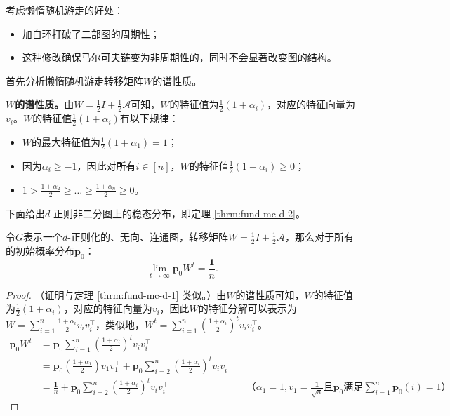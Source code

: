 \documentclass[lang=cn,newtx,10pt,scheme=chinese,chinesefont=nofont,citestyle=gb7714-2015, bibstyle=gb7714-2015]{elegantbook}
\begin{document}
\begin{refsection}
考虑懒惰随机游走的好处：
\begin{itemize}
    \item 加自环打破了二部图的周期性；
    \item 这种修改确保马尔可夫链变为非周期性的，同时不会显著改变图的结构。
\end{itemize}

首先分析懒惰随机游走转移矩阵$W$的谱性质。
            
\vspace{0.2cm}
\textbf{$W$的谱性质。}由$W=\frac{1}{2}I+\frac{1}{2}\mathcal{A}$可知，$W$的特征值为$\frac{1}{2}(1+\alpha_i)$，对应的特征向量为$v_i$。$W$的特征值$\frac{1}{2}(1+\alpha_i)$有以下规律：
\begin{itemize}
    \item $W$的最大特征值为$\frac{1}{2}(1+\alpha_1)=1$；
    \item 因为$\alpha_i\ge -1$，因此对所有$i\in[n]$，$W$的特征值$\frac{1}{2}(1+\alpha_i)\ge 0$；
    \item $1> \frac{1+\alpha_2}{2}\ge \dots\ge \frac{1+\alpha_n}{2}\ge 0$。
\end{itemize}
            
下面给出$d$-正则非二分图上的稳态分布，即定理 \ref{thrm:fund-mc-d-2}。

\begin{theorem}
    \label{thrm:fund-mc-d-2}
    令$G$表示一个$d$-正则化的、无向、连通图，转移矩阵$W=\frac{1}{2}I+\frac{1}{2}\mathcal{A}$，那么对于所有的初始概率分布$\bm{p}_0$：
    \[
        \lim_{t \to \infty} \bm{p}_0W^t  = \frac{\bm{1}}{n}.
    \]
\end{theorem}

\begin{proof}
    （证明与定理 \ref{thrm:fund-mc-d-1} 类似。）由$W$的谱性质可知，$W$的特征值为$\frac{1}{2}(1+\alpha_i)$，对应的特征向量为$v_i$，因此$W$的特征分解可以表示为$W=\sum_{i=1}^n{\frac{1+\alpha_i}{2}v_iv_i^{\top}}$，类似地，$W^t=\sum_{i=1}^n{\left(\frac{1+\alpha_i}{2}\right)^tv_iv_i^{\top}}$。
    \begin{align*}
        \bm{p}_0W^t&=\bm{p}_0\sum_{i=1}^n{\left(\frac{1+\alpha_i}{2}\right)^tv_iv_i^{\top}}\\
        &=\bm{p}_0\left(\frac{1+\alpha_1}{2}\right)v_1v_1^{\top}+\bm{p}_0\sum_{i=2}^n{\left(\frac{1+\alpha_i}{2}\right)^tv_iv_i^{\top}}\\
        &=\frac{\bm{1}}{n}+\bm{p}_0\sum_{i=2}^n{\left(\frac{1+\alpha_i}{2}\right)^tv_iv_i^{\top}}&&\text{（$\alpha_1=1,v_1=\frac{\bm{1}}{\sqrt{n}}$且$\bm{p}_0$满足$\sum_{i=1}^n\bm{p}_0(i)=1$）}
    \end{align*}


\end{proof}
\end{refsection}
\end{document}
